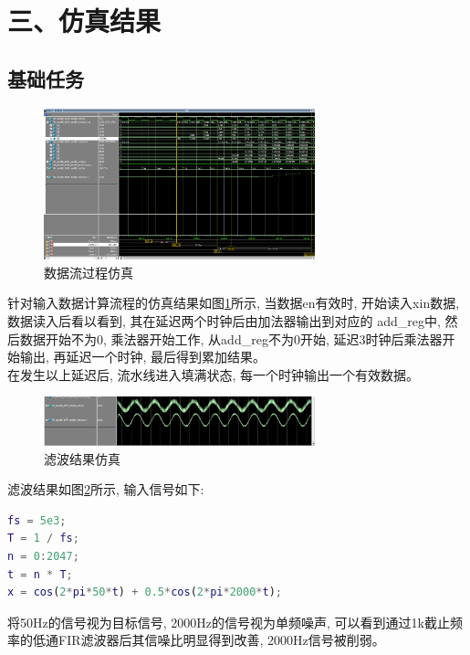 \documentclass{article}
\newcommand{\fourhao}{\fontsize{14pt}{\baselineskip}\selectfont} %
\newcommand{\xiaosihao}{\fontsize{12pt}{\baselineskip}\selectfont} %
\begin{document}
\section*{\fourhao 三、仿真结果}
\xiaosihao
{}
\subsection*{基础任务}
\begin{figure}[htbp]
    \centering
    \includegraphics[width=0.7\textwidth]{image/2024-06-26-16-30-54.png}
    \caption{数据流过程仿真}
    \label{image_base_sim_1}
\end{figure}
针对输入数据计算流程的仿真结果如图\ref{image_base_sim_1}所示, 当数据en有效时, 
开始读入xin数据, 数据读入后看以看到, 其在延迟两个时钟后由加法器输出到对应的
add\_reg中, 然后数据开始不为0, 乘法器开始工作, 从add\_reg不为0开始, 延迟3时钟后乘法器开始输出, 再延迟一个时钟, 最后得到累加结果。\\
在发生以上延迟后, 流水线进入填满状态, 每一个时钟输出一个有效数据。 
\begin{figure}[H]
    \centering
    \includegraphics[width=0.7\textwidth]{image/2024-06-26-16-34-46.png}
    \caption{滤波结果仿真}
    \label{image_base_sim_2}
\end{figure}
滤波结果如图\ref{image_base_sim_2}所示, 输入信号如下:
\begin{lstlisting}[language=Matlab]
fs = 5e3;
T = 1 / fs;
n = 0:2047;
t = n * T;
x = cos(2*pi*50*t) + 0.5*cos(2*pi*2000*t);
\end{lstlisting}
将50Hz的信号视为目标信号, 2000Hz的信号视为单频噪声, 可以看到通过1k截止频率的低通FIR滤波器后其信噪比明显得到改善, 2000Hz信号被削弱。
\end{document}
